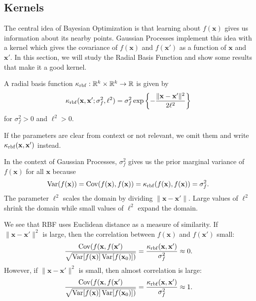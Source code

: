 \subsection{Kernels}

The central idea of Bayesian Optimization is that learning about $f(\mathbf{x})$ gives us information about its nearby points.
Gaussian Processes implement this idea with a kernel which gives the covariance of $f(\mathbf{x})$ and $f(\mathbf{x}')$
as a function of $\mathbf{x}$ and $\mathbf{x}'$.
In this section, we will study the Radial Basis Function and show some results that make it a good kernel.

\begin{definition}
    A radial basis function $\kappa_{\mathrm{rbf}}: \mathbb{R}^{k} \times \mathbb{R}^{k} \to \mathbb{R}$
    is given by
    \begin{equation*}
        \kappa_{\mathrm{rbf}}(\mathbf{x}, \mathbf{x}'; \sigma_f^2, \ell^2)
        = \sigma_f^{2} \exp \left\{ - \frac{ \lVert \mathbf{x} - \mathbf{x}' \rVert^2 }{ 2 \ell^2 }\right\}
    \end{equation*}
    for $\sigma_f^2 > 0$ and $\ell^2 > 0$.

    If the parameters are clear from context or not relevant, we omit them and write $\kappa_{\mathrm{rbf}}(\mathbf{x}, \mathbf{x}')$ instead.
\end{definition}
In the context of Gaussian Processes, $\sigma_f^2$ gives us the prior marginal variance of $f(\mathbf{x})$ for all $\mathbf{x}$ because
\begin{equation*}
    \operatorname{Var}(f(\mathbf{x})) = \operatorname{Cov}(f(\mathbf{x}), f(\mathbf{x})) = \kappa_{\mathrm{rbf}}(f(\mathbf{x}), f(\mathbf{x})) = \sigma_f^2.
\end{equation*}
The parameter $\ell^2$ scales the domain by dividing $\lVert \mathbf{x} - \mathbf{x}' \rVert$.
Large values of $\ell^2$ shrink the domain while small values of $\ell^2$ expand the domain.

We see that RBF uses Euclidean distance as a measure of similarity.
If $\lVert \mathbf{x} - \mathbf{x}' \rVert^2$ is large, then the correlation between $f(\mathbf{x})$ and $f(\mathbf{x}')$ small:
\[
    \frac{\operatorname{Cov}(f(\mathbf{x}, f(\mathbf{x}')}{\sqrt{\operatorname{Var}[f(\mathbf{x})]\operatorname{Var}[f(\mathbf{x}_0)])}}
    = \frac{\kappa_{\mathrm{rbf}}(\mathbf{x}, \mathbf{x}')}{\sigma_f^2} \approx 0.
\]
However, if $\lVert \mathbf{x} - \mathbf{x}' \rVert^2$ is small, then almost correlation is large:
\begin{equation*}
    \frac{\operatorname{Cov}(f(\mathbf{x}, f(\mathbf{x}')}{\sqrt{\operatorname{Var}[f(\mathbf{x})]\operatorname{Var}[f(\mathbf{x}_0)])}}
    = \frac{\kappa_{\mathrm{rbf}}(\mathbf{x}, \mathbf{x}')}{\sigma_f^2} \approx 1.
\end{equation*}

